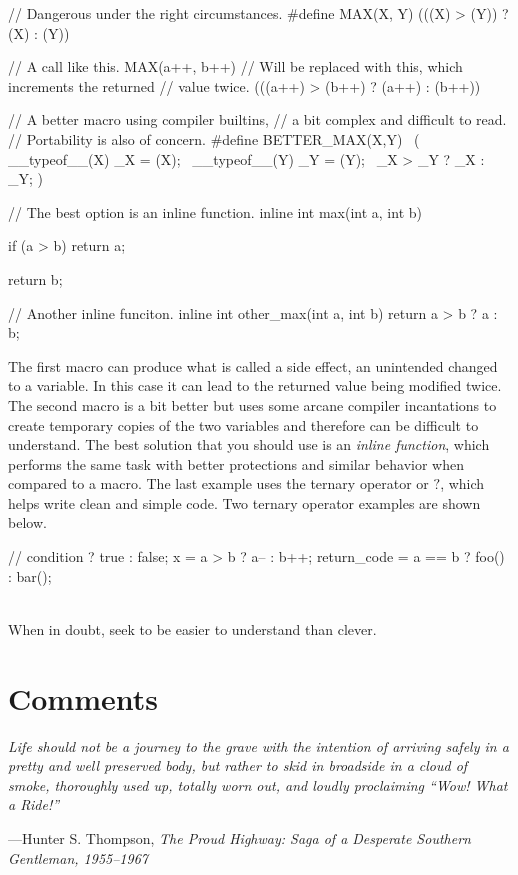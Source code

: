 \documentclass[11pt]{article}
\begin{document}
\begin{codelisting}{}
// Dangerous under the right circumstances.
#define MAX(X, Y) (((X) > (Y)) ? (X) : (Y))

// A call like this.
MAX(a++, b++)
// Will be replaced with this, which increments the returned
// value twice.
(((a++) > (b++) ? (a++) : (b++))

// A better macro using compiler builtins,
// a bit complex and difficult to read.
// Portability is also of concern.
#define BETTER_MAX(X,Y) \
    ({ __typeof__(X) _X = (X); \
     __typeof__(Y) _Y = (Y);  \
     _X > _Y ? _X : _Y; })

// The best option is an inline function.
inline int max(int a, int b) {
    if (a > b) {
        return a;
    }

    return b;
}

// Another inline funciton.
inline int other_max(int a, int b) {
    return a > b ? a : b;
}
\end{codelisting}

The first macro can produce what is called a side effect, an unintended changed
to a variable. In this case it can lead to the returned value being modified
twice.  The second macro is a bit better but uses some arcane compiler
incantations to create temporary copies of the two variables and therefore can
be difficult to understand. The best solution that you should use is an
\emph{inline function}, which performs the same task with better protections and
similar behavior when compared to a macro. The last example uses the ternary
operator or $?$, which helps write clean and simple code. Two ternary operator
examples are shown below.

\begin{codelisting}{}
// condition ? true : false;
x = a > b ? a-- : b++;
return_code = a == b ? foo() : bar();
\end{codelisting}\\

When in doubt, seek to be easier to understand than clever.


\section{Comments}

\textwidth
\epigraph{\emph{Life should not be a journey to the grave with the intention of arriving safely in a pretty and well preserved body, but rather to skid in broadside in a cloud of smoke, thoroughly used up, totally worn out, and loudly proclaiming ``Wow! What a Ride!''}}
{---Hunter S. Thompson, \emph{The Proud Highway: Saga of a Desperate Southern Gentleman, 1955--1967}}
\end{document}
